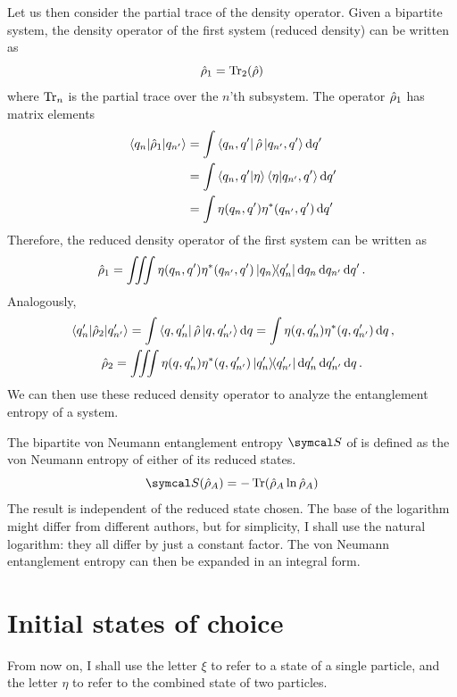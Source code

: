 Let us then consider the partial trace of the density operator. Given a bipartite system, the density operator of the first system (reduced density) can be written as
\begin{equation}
    \hat{\rho}_1 = \Tr_2(\hat{\rho})
\end{equation}
where $\Tr_n$ is the partial trace over the $n$'th subsystem. The operator $\hat{\rho}_1$ has matrix elements
\begin{align}
    \mel{q_n}{\hat{\rho}_1}{q_{n'}} &= \int\bra{q_n, q'}\hat{\rho}\ket{q_{n'}, q'}\dd{q'} \\
    &= \int\braket{q_n, q'}{\eta}\braket{\eta}{q_{n'}, q'}\dd{q'} \\
    &= \int\eta(q_n, q')\eta^{\ast}(q_{n'}, q')\dd{q'}
\end{align}
Therefore, the reduced density operator of the first system can be written as
\begin{equation}
    \hat{\rho}_1 = \iiint\eta(q_n, q')\eta^{\ast}(q_{n'}, q')\ketbra{q_n}{q_n'}\dd{q_n}\dd{q_{n'}}\dd{q'}.
\end{equation}
Analogously,
\begin{gather}
    \mel{q_n'}{\hat{\rho}_2}{q_{n'}'} = \int\bra{q, q_n'}\hat{\rho}\ket{q, q_{n'}'}\dd{q} = \int\eta(q, q_n')\eta^{\ast}(q, q_{n'}')\dd{q}, \\
    \hat{\rho}_2 = \iiint\eta(q, q_n')\eta^{\ast}(q, q_{n'}')\ketbra{q_n'}{q_{n'}'}\dd{q_n'}\dd{q_{n'}'}\dd{q}.
\end{gather}
We can then use these reduced density operator to analyze the entanglement entropy of a system.

The bipartite von Neumann entanglement entropy $\entrp$ of is defined as the von Neumann entropy of either of its reduced states.
\begin{equation}
    \entrp(\dnst_A) = -\Tr(\dnst_A\ln\dnst_A)
\end{equation}
The result is independent of the reduced state chosen. The base of the logarithm might differ from different authors, but for simplicity, I shall use the natural logarithm: they all differ by just a constant factor. The von Neumann entanglement entropy can then be expanded in an integral form.

\section{Initial states of choice}
\label{sec:initial_states_of_choice}

From now on, I shall use the letter $\xi$ to refer to a state of a single particle, and the letter $\eta$ to refer to the combined state of two particles.

